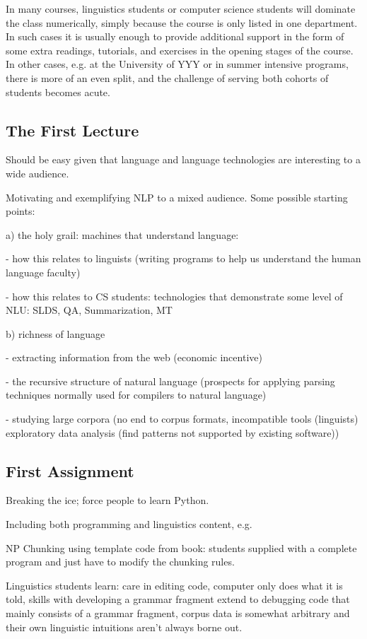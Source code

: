 \documentclass[11pt]{article}
\begin{document}
In many courses, linguistics students or computer science students
will dominate the class numerically, simply because the course is only
listed in one department.  In such cases it is usually enough to
provide additional support in the form of some extra readings,
tutorials, and exercises in the opening stages of the course.  In
other cases, e.g. at the University of YYY or in summer intensive
programs, there is more of an even split, and the challenge of serving
both cohorts of students becomes acute.

\subsection{The First Lecture}

Should be easy given that language and language technologies are interesting
to a wide audience.

Motivating and exemplifying NLP to a mixed audience.
Some possible starting points:

a) the holy grail: machines that understand language:

- how this relates to linguists (writing programs to help us
  understand the human language faculty)

- how this relates to CS students: technologies that demonstrate some level of NLU:
  SLDS, QA, Summarization, MT

b) richness of language

- extracting information from the web (economic incentive)

- the recursive structure of natural language (prospects for applying
  parsing techniques normally used for compilers to natural language)

- studying large corpora
  (no end to corpus formats, incompatible tools (linguists)
  exploratory data analysis (find patterns not supported by existing software))

\subsection{First Assignment}

Breaking the ice; force people to learn Python.

Including both programming and linguistics content, e.g.

NP Chunking using template code from book: students supplied with a
complete program and just have to modify the chunking rules.

Linguistics students learn: care in editing code, computer only does what it is told,
skills with developing a grammar fragment extend to debugging code that mainly consists
of a grammar fragment,
corpus data is somewhat arbitrary and their own linguistic intuitions aren't always
borne out.
\end{document}
